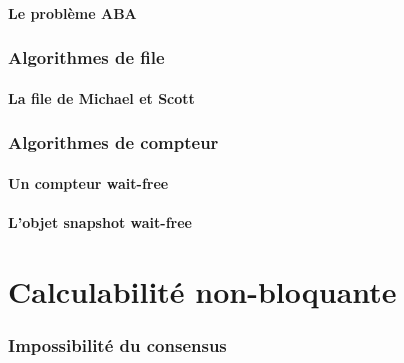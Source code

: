 \documentclass[9pt]{beamer}
\begin{document}
\subsection{Le problème ABA}




\section{Algorithmes de file}

\subsection{La file de Michael et Scott}







\section{Algorithmes de compteur}

\subsection{Un compteur wait-free}






\subsection{L'objet snapshot wait-free}






\part{Calculabilité non-bloquante}


\section{Impossibilité du consensus}
\end{document}
